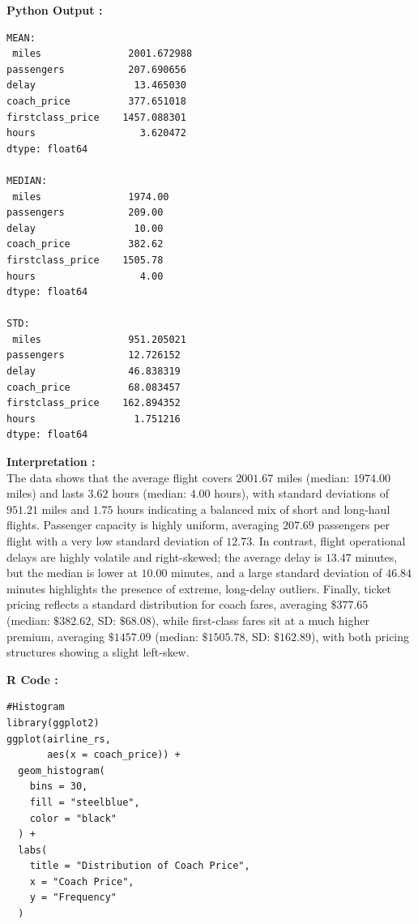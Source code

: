 \documentclass[11pt,a4paper]{article}
\begin{document}
\vspace{0.5em}
\noindent \textbf{Python Output :}

\begin{verbatim}
MEAN:
 miles               2001.672988
passengers           207.690656
delay                 13.465030
coach_price          377.651018
firstclass_price    1457.088301
hours                  3.620472
dtype: float64

MEDIAN:
 miles               1974.00
passengers           209.00
delay                 10.00
coach_price          382.62
firstclass_price    1505.78
hours                  4.00
dtype: float64

STD:
 miles               951.205021
passengers           12.726152
delay                46.838319
coach_price          68.083457
firstclass_price    162.894352
hours                 1.751216
dtype: float64
\end{verbatim}


\vspace{0.5em}

\noindent \textbf{Interpretation :} \\
The data shows that the average flight covers $2001.67$ miles (median: $1974.00$ miles) and lasts $3.62$ hours (median: $4.00$ hours), with standard deviations of $951.21$ miles and $1.75$ hours indicating a balanced mix of short and long-haul flights. Passenger capacity is highly uniform, averaging $207.69$ passengers per flight with a very low standard deviation of $12.73$. In contrast, flight operational delays are highly volatile and right-skewed; the average delay is $13.47$ minutes, but the median is lower at $10.00$ minutes, and a large standard deviation of $46.84$ minutes highlights the presence of extreme, long-delay outliers. Finally, ticket pricing reflects a standard distribution for coach fares, averaging $\$377.65$ (median: $\$382.62$, SD: $\$68.08$), while first-class fares sit at a much higher premium, averaging $\$1457.09$ (median: $\$1505.78$, SD: $\$162.89$), with both pricing structures showing a slight left-skew.

\vspace{2.5em}
\newpage
\noindent \textbf{R Code :}
\begin{codebox}
\begin{lstlisting}[style=Rstyle]
#Histogram
library(ggplot2)
ggplot(airline_rs,
       aes(x = coach_price)) +
  geom_histogram(
    bins = 30,
    fill = "steelblue",
    color = "black"
  ) +
  labs(
    title = "Distribution of Coach Price",
    x = "Coach Price",
    y = "Frequency"
  )

\end{lstlisting}
\end{codebox}
\end{document}
